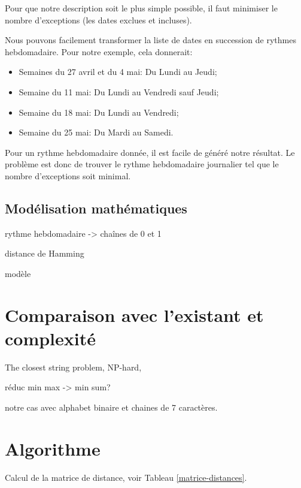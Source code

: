 \documentclass{roadef}
\begin{document}
Pour que notre description soit le plus simple possible, il faut
minimiser le nombre d'exceptions (les dates exclues et incluses).

Nous pouvons facilement transformer la liste de dates en succession de
rythmes hebdomadaire. Pour notre exemple, cela donnerait:
\begin{itemize}
\item Semaines du 27 avril et du 4 mai: Du Lundi au Jeudi;
\item Semaine du 11 mai: Du Lundi au Vendredi sauf Jeudi;
\item Semaine du 18 mai: Du Lundi au Vendredi;
\item Semaine du 25 mai: Du Mardi au Samedi.
\end{itemize}

Pour un rythme hebdomadaire donnée, il est facile de généré notre
résultat.  Le problème est donc de trouver le rythme hebdomadaire
journalier tel que le nombre d'exceptions soit minimal.

\subsection{Modélisation mathématiques}

rythme hebdomadaire -> chaînes de 0 et 1

distance de Hamming

modèle

\section{Comparaison avec l'existant et complexité}

The closest string problem, NP-hard, \cite{lanctot2003distinguishing}

réduc min max -> min sum?

notre cas avec alphabet binaire et chaines de 7 caractères.

\section{Algorithme}

Calcul de la matrice de distance, voir Tableau \ref{matrice-distances}.
\end{document}
